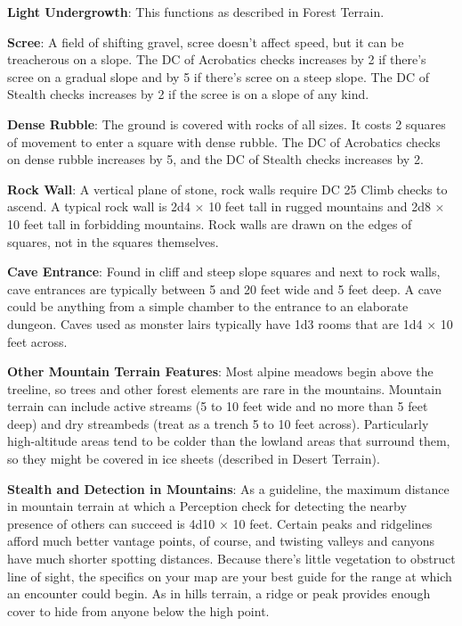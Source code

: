 \textbf{Light Undergrowth}: This functions as described in Forest Terrain.
				
\textbf{Scree}: A field of shifting gravel, scree doesn't affect speed, but it can be treacherous on a slope. The DC of Acrobatics checks increases by 2 if there's scree on a gradual slope and by 5 if there's scree on a steep slope. The DC of Stealth checks increases by 2 if the scree is on a slope of any kind.
				
\textbf{Dense Rubble}: The ground is covered with rocks of all sizes. It costs 2 squares of movement to enter a square with dense rubble. The DC of Acrobatics checks on dense rubble increases by 5, and the DC of Stealth checks increases by 2. 
				
\textbf{Rock Wall}: A vertical plane of stone, rock walls require DC 25 Climb checks to ascend. A typical rock wall is 2d4 \mbox{$\times$} 10 feet tall in rugged mountains and 2d8 \mbox{$\times$} 10 feet tall in forbidding mountains. Rock walls are drawn on the edges of squares, not in the squares themselves.
				
\textbf{Cave Entrance}: Found in cliff and steep slope squares and next to rock walls, cave entrances are typically between 5 and 20 feet wide and 5 feet deep. A cave could be anything from a simple chamber to the entrance to an elaborate dungeon. Caves used as monster lairs typically have 1d3 rooms that are 1d4 \mbox{$\times$} 10 feet across. 
				
\textbf{Other Mountain Terrain Features}: Most alpine meadows begin above the treeline, so trees and other forest elements are rare in the mountains. Mountain terrain can include active streams (5 to 10 feet wide and no more than 5 feet deep) and dry streambeds (treat as a trench 5 to 10 feet across). Particularly high-altitude areas tend to be colder than the lowland areas that surround them, so they might be covered in ice sheets (described in Desert Terrain).
				
\textbf{Stealth and Detection in Mountains}: As a guideline, the maximum distance in mountain terrain at which a Perception check for detecting the nearby presence of others can succeed is 4d10 \mbox{$\times$} 10 feet. Certain peaks and ridgelines afford much better vantage points, of course, and twisting valleys and canyons have much shorter spotting distances. Because there's little vegetation to obstruct line of sight, the specifics on your map are your best guide for the range at which an encounter could begin. As in hills terrain, a ridge or peak provides enough cover to hide from anyone below the high point.
				
